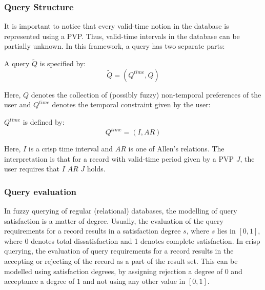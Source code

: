 
\subsubsection{Query Structure}
It is important to notice that every valid-time notion in the database is represented using a PVP. Thus, valid-time intervals in the database can be partially unknown. In this framework, a query has two separate parts:



\begin{definition}
A query $\tilde Q$ is specified by:
\begin{equation}
\label{eq:query-definition}
\tilde Q = \left( Q^{time}, Q \right)
\end{equation}
\end{definition}
Here, $Q$ denotes the collection of (possibly fuzzy) non-temporal preferences of the user and $Q^{time}$ denotes the temporal constraint given by the user:
\begin{definition}
 $Q^{time}$ is defined by:
\begin{equation}
Q^{time} = \left( I , AR \right)
\end{equation}
\end{definition}
Here, $I$ is a crisp time interval and $AR$ is one of Allen's relations\cite{Allen83}. The interpretation is that for a record with valid-time period given by a PVP $J$, the user requires that $I$ $AR$ $J$ holds.



\subsubsection{Query evaluation}
In fuzzy querying of regular (relational) databases, the modelling of query satisfaction is a matter of degree. Usually, the evaluation of the query requirements for a record results in a satisfaction degree $s$, where $s$ lies in $\left[0,1\right]$, where 0 denotes total dissatisfaction and 1 denotes complete satisfaction. In crisp querying, the evaluation of query requirements for a record results in the accepting or rejecting of the record as a part of the result set. This can be modelled using satisfaction degrees, by assigning rejection a degree of $0$ and acceptance a degree of $1$ and not using any other value in $\left[0,1\right]$.

